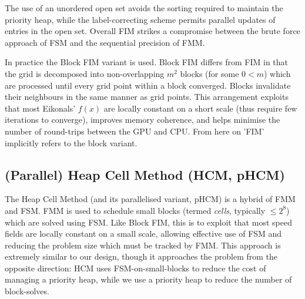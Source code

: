 \documentclass[11pt]{article}       %
\begin{document}
The use of an unordered open set avoids the sorting required to maintain the priority heap, while the label-correcting scheme permits parallel updates of entries in the open set. Overall FIM strikes a compromise between the brute force approach of FSM and the sequential precision of FMM.

In practice the Block FIM variant is used. Block FIM differs from FIM in that the grid is decomposed into non-overlapping $m^2$ blocks (for some $0 < m$) which are processed until every grid point within a block converged. Blocks invalidate their neighbours in the same manner as grid points. This arrangement exploits that most Eikonals' $f(x)$ are locally constant on a short scale (thus require few iterations to converge), improves memory coherence, and helps minimise the number of round-trips between the GPU and CPU. From here on 'FIM' implicitly refers to the block variant.

\subsection{(Parallel) Heap Cell Method (HCM, pHCM)}\label{sec:HCM}
The Heap Cell Method\cite{chacon2012fast} (and its parallelised variant, pHCM\cite{chacon2014parallel}) is a hybrid of FMM and FSM. FMM is used to schedule small blocks (termed \textit{cells}, typically $\le 2^8$) which are solved using FSM. Like Block FIM, this is to exploit that most speed fields are locally constant on a small scale, allowing effective use of FSM and reducing the problem size which must be tracked by FMM. This approach is extremely similar to our design, though it approaches the problem from the opposite direction: HCM uses FSM-on-small-blocks to reduce the cost of managing a priority heap, while we use a priority heap to reduce the number of block-solves.

\end{document}
